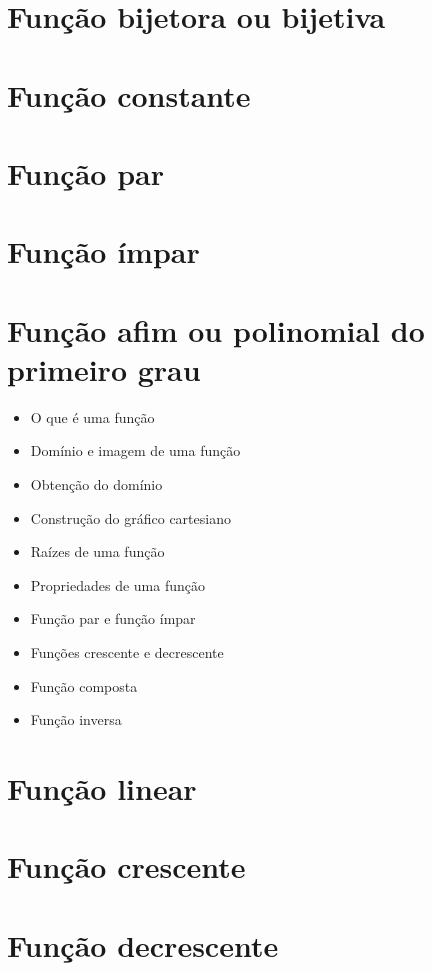 \documentclass[11pt,fleqn]{book} %
\begin{document}
\chapter{Função bijetora ou bijetiva}

\chapter{Função constante}

\chapter{Função par}

\chapter{Função ímpar}

\chapter{Função afim ou polinomial do primeiro grau}
    \begin{itemize}
    	\item O que é uma função
    	\item Domínio e imagem de uma função
    	\item Obtenção do domínio
    	\item Construção do gráfico cartesiano
    	\item Raízes de uma função
    	\item Propriedades de uma função
    	\item Função par e função ímpar
    	\item Funções crescente e decrescente
    	\item Função composta
    	\item Função inversa
    \end{itemize}

\chapter{Função linear}

\chapter{Função crescente}

\chapter{Função decrescente}
\end{document}

